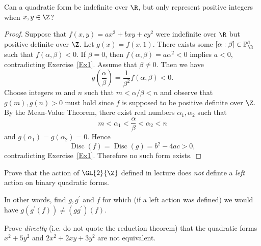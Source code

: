 \documentclass[10pt]{amsart}
\begin{document}
\begin{thm}
	Can a quadratic form be indefinite over $\R$, but only represent positive integers when $x, y \in \Z$?

	\begin{proof}
		Suppose that $f(x,y) = ax^2 + bxy + cy^2$ were indefinite over $\R$ but positive definite over $\Z$.
		Let $g(x) = f(x,1)$.
		There exists some $[\alpha : \beta] \in \mathbb{P}_{\R}^1$ such that $f(\alpha,\beta) < 0$.
		If $\beta = 0$, then $f(\alpha,\beta) = a\alpha^2 < 0$ implies $a < 0$, contradicting Exercise~\ref{Ex1}.
		Assume that $\beta \neq 0$.
		Then we have
		$$g\left(\frac{\alpha}{\beta}\right) = \frac{1}{\beta^2}f(\alpha, \beta) < 0.$$
		Choose integers $m$ and $n$ such that $m < \alpha/\beta < n$ and observe that $g(m), g(n) > 0$ must hold since $f$ is supposed to be positive definite over $\Z$.
		By the Mean-Value Theorem, there exist real numbers $\alpha_1, \alpha_2$ such that 
		$$m < \alpha_1 < \frac{\alpha}{\beta} < \alpha_2 < n$$
		and $g(\alpha_1) = g(\alpha_2) = 0$.
		Hence 
		$$\operatorname{Disc}(f) = \operatorname{Disc}(g) = b^2 - 4ac> 0,$$
		contradicting Exercise~\ref{Ex1}.
		Therefore no such form exists.		
	\end{proof}
\end{thm}

\begin{thm}
	Prove that the action of $\GL{2}{\Z}$ defined in lecture does {\it not} definte a {\it left} action on binary quadratic forms.

	In other words, find $g, g^\prime$ and $f$ for which (if a left action was defined) we would have $g(g^\prime(f)) \neq (gg^\prime)(f)$.
\end{thm}

\begin{thm}
	Prove {\it directly} (i.e. do not quote the reduction theorem) that the quadratic forms $x^2 + 5y^2$ and $2x^2 + 2xy + 3y^2$ are not equivalent.
\end{thm}
\end{document}
